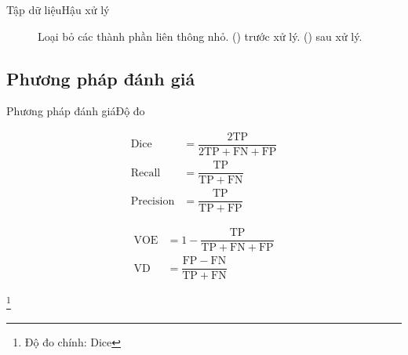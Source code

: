 \documentclass[
	10pt,                %
	aspectratio=169,     %
]{beamer}
\begin{document}
\begin{frame}{Tập dữ liệu}{Hậu xử lý}
\begin{figure}[h!]
\begin{subfigure}[b]{0.3\textwidth}
				\caption{}
				\label{fig:post_processing_after}
			\end{subfigure}
			\vspace{-3mm}
			\caption{Loại bỏ các thành phần liên thông nhỏ. () trước xử lý. () sau xử lý.}
		\end{figure}
	\end{frame}
\subsection{Phương pháp đánh giá}
	\begin{frame}{Phương pháp đánh giá}{Độ đo}
	    \begin{minipage}[t]{.45\textwidth}
			\begin{align}
        		\mathrm{Dice} &= \mathrm{\dfrac{2TP}{2TP + FN + FP}} \\
        		\mathrm{Recall} &= \mathrm{\dfrac{TP}{TP + FN}} \\
        		\mathrm{Precision} &= \mathrm{\dfrac{TP}{TP + FP}}
            \end{align}
	    \end{minipage}\hspace*{2mm}%
		\begin{minipage}[t]{.45\textwidth}
		    \begin{align}
		    \mathrm{VOE} &= 1 - \mathrm{\dfrac{TP}{TP + FN + FP}} \\
			\mathrm{VD} &= \mathrm{\dfrac{FP - FN}{TP + FN}}
			\end{align}
	    \end{minipage}
		
		\vspace{-8mm}\let\thefootnote\relax\footnote{\hspace{-3mm}\tiny *Độ đo chính: Dice}
	\end{frame}
\end{document}
